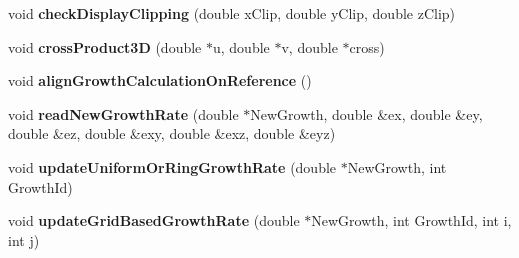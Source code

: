\begin{DoxyCompactItemize}
\item 
\hypertarget{classShapeBase_a3a3490f8a96e14e59b82f4de24ce48e2}{}void {\bfseries check\+Display\+Clipping} (double x\+Clip, double y\+Clip, double z\+Clip)\label{classShapeBase_a3a3490f8a96e14e59b82f4de24ce48e2}

\item 
\hypertarget{classShapeBase_ab5c4c774227af1d446f80c0ef58044c9}{}void {\bfseries cross\+Product3\+D} (double $\ast$u, double $\ast$v, double $\ast$cross)\label{classShapeBase_ab5c4c774227af1d446f80c0ef58044c9}

\item 
\hypertarget{classShapeBase_a9a980e69b3ccad29e21499921d575829}{}void {\bfseries align\+Growth\+Calculation\+On\+Reference} ()\label{classShapeBase_a9a980e69b3ccad29e21499921d575829}

\item 
\hypertarget{classShapeBase_a8f1565bbfd6c6a1452d95d910b4f7d9e}{}void {\bfseries read\+New\+Growth\+Rate} (double $\ast$New\+Growth, double \&ex, double \&ey, double \&ez, double \&exy, double \&exz, double \&eyz)\label{classShapeBase_a8f1565bbfd6c6a1452d95d910b4f7d9e}

\item 
\hypertarget{classShapeBase_a62f7b57ae77a98a009ba2c5cd520fa71}{}void {\bfseries update\+Uniform\+Or\+Ring\+Growth\+Rate} (double $\ast$New\+Growth, int Growth\+Id)\label{classShapeBase_a62f7b57ae77a98a009ba2c5cd520fa71}

\item 
\hypertarget{classShapeBase_aff32f6cd08aba5c167297852b72e40b0}{}void {\bfseries update\+Grid\+Based\+Growth\+Rate} (double $\ast$New\+Growth, int Growth\+Id, int i, int j)\label{classShapeBase_aff32f6cd08aba5c167297852b72e40b0}

\end{DoxyCompactItemize}
